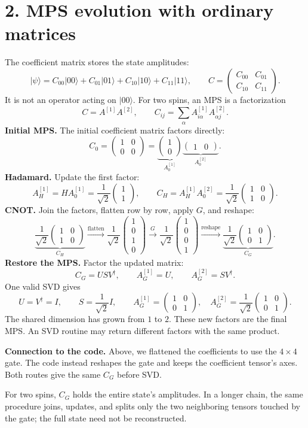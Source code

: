 \documentclass[11pt]{article}
\newcommand{\ket}[1]{\lvert #1\rangle}
\newcommand{\vfour}[4]{\begin{pmatrix}#1\\#2\\#3\\#4\end{pmatrix}}
\newcommand{\mtwo}[4]{\begin{pmatrix}#1&#2\\#3&#4\end{pmatrix}}
\begin{document}
\newpage
\section*{2. MPS evolution with ordinary matrices}
The coefficient matrix stores the state amplitudes:
\[
\ket{\psi}=C_{00}\ket{00}+C_{01}\ket{01}+C_{10}\ket{10}+C_{11}\ket{11},
\qquad C=\mtwo{C_{00}}{C_{01}}{C_{10}}{C_{11}}.
\]
It is not an operator acting on $\ket{00}$. For two spins, an MPS is a factorization
\[
C=A^{[1]}A^{[2]},\qquad
C_{ij}=\sum_\alpha A^{[1]}_{i\alpha}A^{[2]}_{\alpha j}.
\]
\textbf{Initial MPS.} The initial coefficient matrix factors directly:
\[
C_0=\mtwo{1}{0}{0}{0}
=\underbrace{\begin{pmatrix}1\\0\end{pmatrix}}_{A_0^{[1]}}
\underbrace{\begin{pmatrix}1&0\end{pmatrix}}_{A_0^{[2]}}.
\]
\textbf{Hadamard.} Update the first factor:
\[
A_H^{[1]}=HA_0^{[1]}=\frac1{\sqrt2}\begin{pmatrix}1\\1\end{pmatrix},
\qquad
C_H=A_H^{[1]}A_0^{[2]}=\frac1{\sqrt2}\mtwo{1}{0}{1}{0}.
\]
\textbf{CNOT.} Join the factors, flatten row by row, apply $G$, and reshape:
\[
\underbrace{\frac1{\sqrt2}\mtwo{1}{0}{1}{0}}_{C_H}
\xrightarrow{\text{flatten}}
\frac1{\sqrt2}\vfour{1}{0}{1}{0}
\xrightarrow{G}
\frac1{\sqrt2}\vfour{1}{0}{0}{1}
\xrightarrow{\text{reshape}}
\underbrace{\frac1{\sqrt2}\mtwo{1}{0}{0}{1}}_{C_G}.
\]
\textbf{Restore the MPS.} Factor the updated matrix:
\[
C_G=USV^\dagger,\qquad
A_G^{[1]}=U,\qquad A_G^{[2]}=SV^\dagger.
\]
One valid SVD gives
\[
U=V^\dagger=I,\qquad S=\frac1{\sqrt2}I,
\qquad
\boxed{A_G^{[1]}=\mtwo{1}{0}{0}{1},\quad
A_G^{[2]}=\frac1{\sqrt2}\mtwo{1}{0}{0}{1}.}
\]
The shared dimension has grown from $1$ to $2$. These new factors are the final MPS. An SVD routine may return different factors with the same product.

\textbf{Connection to the code.} Above, we flattened the coefficients to use the $4\times4$ gate. The code instead reshapes the gate and keeps the coefficient tensor's axes. Both routes give the same $C_G$ before SVD.

For two spins, $C_G$ holds the entire state's amplitudes. In a longer chain, the same procedure joins, updates, and splits only the two neighboring tensors touched by the gate; the full state need not be reconstructed.
\end{document}
